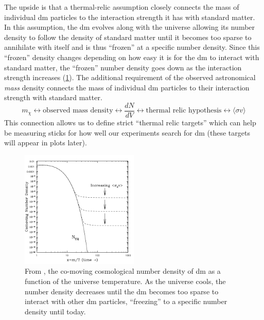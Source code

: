The upside is that a thermal-relic assumption closely connects the mass of individual \ac{dm}
particles to the interaction strength it has with standard matter. In this assumption, the \ac{dm}
evolves along with the universe allowing its number density to follow the density of standard
matter until it becomes too sparse to annihilate with itself and is thus ``frozen'' at a specific
number density. Since this ``frozen'' density changes depending on how easy it is for the
\ac{dm} to interact with standard matter, the ``frozen'' number density goes down as the
interaction strength increases (\cref{fig:number-density}). The additional requirement of the
observed astronomical \emph{mass} density connects the mass of individual \ac{dm} particles to
their interaction strength with standard matter.
\begin{equation*}
	m_\chi \leftrightarrow \text{observed mass density}
	\leftrightarrow \frac{dN}{dV} \leftrightarrow
	\text{thermal relic hypothesis} \leftrightarrow
	\langle\sigma v\rangle
\end{equation*}
This connection allows us to define strict ``thermal relic targets'' which can help be measuring
sticks for how well our experiments search for \ac{dm} (these targets will appear in plots later).

\begin{figure}
	\centering
	\includegraphics[width=0.5\textwidth]{figures/theory/number-density-at-freeze-out.png}
	\caption{
		From \cite{thermal-freezeout-diagram-1996}, the co-moving cosmological number density of \ac{dm} as a function of the universe
		temperature. As the universe cools, the number density decreases until the \ac{dm}
		becomes too sparse to interact with other \ac{dm} particles, ``freezing'' to a specific
		number density until today.
	}
	\label{fig:number-density}
\end{figure}

